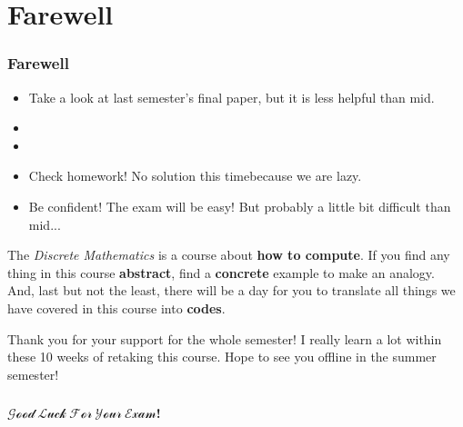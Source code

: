 \documentclass{beamer}
\begin{document}
\section{Farewell}
\begin{frame}
    \frametitle{Farewell}
    \begin{itemize}
        \item Take a look at last semester's final paper, but it is less helpful than mid.
        \item {}
        \item {}
        \item Check homework! No solution this time\textcolor[cmyk]{0.01,0.01,0.01,0.01}{because we are lazy}. 
        \item Be confident! The exam will be easy! 
        \textcolor[cmyk]{0.01,0.01,0.01,0.01}{But probably 
        a little bit difficult than mid...}
    \end{itemize}
    \hh The \textit{Discrete Mathematics} is a course about 
    \textbf{how to compute}. If you find any thing in this course \textbf{abstract}, 
    find a \textbf{concrete} example to make an analogy. And, last but not the least, there will be a day for you to translate
all things we have covered in this course into \textbf{codes}.
    \par 
    \hh Thank you for your support for the whole semester! I really learn
    a lot within these 10 weeks of retaking this course. Hope to see you 
    offline in the summer semester!
\end{frame}
\usebackgroundtemplate{}
\begin{frame}
    \frametitle{}
    \centering
    
    \textcolor[rgb]{0.3,0.3,0.3}{\textbf{\huge{$\mathcal{Good~Luck~For~Your~Exam}$!}}}
\end{frame}
\end{document}
